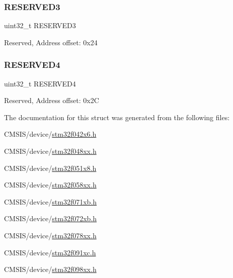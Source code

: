 \subsubsection{\texorpdfstring{R\+E\+S\+E\+R\+V\+E\+D3}{RESERVED3}}
{\footnotesize\ttfamily uint32\+\_\+t R\+E\+S\+E\+R\+V\+E\+D3}

Reserved, Address offset\+: 0x24 \mbox{\label{struct_t_s_c___type_def_ac0018930ee9f18afda25b695b9a4ec16}} 
\subsubsection{\texorpdfstring{R\+E\+S\+E\+R\+V\+E\+D4}{RESERVED4}}
{\footnotesize\ttfamily uint32\+\_\+t R\+E\+S\+E\+R\+V\+E\+D4}

Reserved, Address offset\+: 0x2C 

The documentation for this struct was generated from the following files\+:\begin{DoxyCompactItemize}
\item 
C\+M\+S\+I\+S/device/\hyperlink{stm32f042x6_8h}{stm32f042x6.\+h}\item 
C\+M\+S\+I\+S/device/\hyperlink{stm32f048xx_8h}{stm32f048xx.\+h}\item 
C\+M\+S\+I\+S/device/\hyperlink{stm32f051x8_8h}{stm32f051x8.\+h}\item 
C\+M\+S\+I\+S/device/\hyperlink{stm32f058xx_8h}{stm32f058xx.\+h}\item 
C\+M\+S\+I\+S/device/\hyperlink{stm32f071xb_8h}{stm32f071xb.\+h}\item 
C\+M\+S\+I\+S/device/\hyperlink{stm32f072xb_8h}{stm32f072xb.\+h}\item 
C\+M\+S\+I\+S/device/\hyperlink{stm32f078xx_8h}{stm32f078xx.\+h}\item 
C\+M\+S\+I\+S/device/\hyperlink{stm32f091xc_8h}{stm32f091xc.\+h}\item 
C\+M\+S\+I\+S/device/\hyperlink{stm32f098xx_8h}{stm32f098xx.\+h}\end{DoxyCompactItemize}
